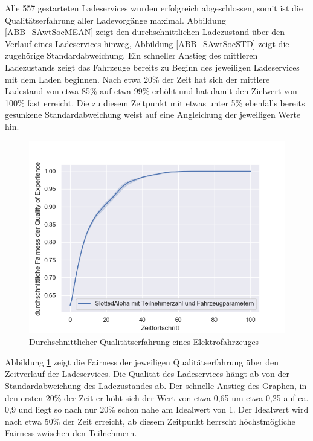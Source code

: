 Alle 557 gestarteten Ladeservices wurden erfolgreich abgeschlossen, somit ist die Qualitätserfahrung aller Ladevorgänge maximal. Abbildung \ref{ABB_SAwtSocMEAN} zeigt den durchschnittlichen Ladezustand über den Verlauf eines Ladeservices hinweg, Abbildung \ref{ABB_SAwtSocSTD} zeigt die zugehörige Standardabweichung. Ein schneller Anstieg des mittleren Ladezustands zeigt das Fahrzeuge bereits zu Beginn des jeweiligen Ladeservices mit dem Laden beginnen. Nach etwa 20\% der Zeit hat sich der mittlere Ladestand von etwa 85\% auf etwa 99\% erhöht und hat damit den Zielwert von 100\% fast erreicht. Die zu diesem Zeitpunkt mit etwas unter 5\% ebenfalls bereits gesunkene Standardabweichung weist auf eine Angleichung der jeweiligen Werte hin.\\
\begin{figure}[htb]
\centering
	\includegraphics[scale=0.4]{img/SA_wT/SlottedAloha_waitingTime_VDE_tau_6_qoe.png}
	\caption{Durchschnittlicher Qualitätserfahrung eines Elektrofahrzeuges}
	\label{Abb_SAwTFairness}
\end{figure}

Abbildung \ref{Abb_SAwTFairness} zeigt die Fairness der jeweiligen Qualitätserfahrung über den Zeitverlauf der Ladeservices. Die Qualität des Ladeservices hängt ab von der Standardabweichung des Ladezustandes ab. Der schnelle Anstieg des Graphen, in den ersten 20\% der Zeit er höht sich der Wert von etwa 0,65 um etwa 0,25 auf ca. 0,9 und liegt so nach nur 20\% schon nahe am Idealwert von 1. Der Idealwert wird nach etwa 50\% der Zeit erreicht, ab diesem Zeitpunkt herrscht höchstmögliche Fairness zwischen den Teilnehmern.

